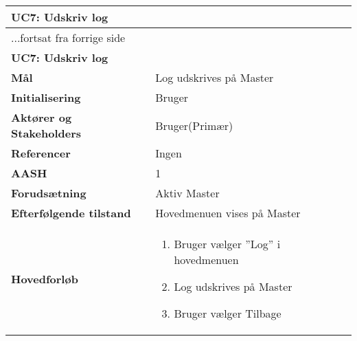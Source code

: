 \begin{center} \centering \label{UC7}
	\begin{longtable}{|p{5cm}|p{9cm}|}  %
	\hline
		\multicolumn{2}{|l|}{\textbf{UC7: Udskriv log}} \\\hline %
		\endfirsthead
		
		\multicolumn{2}{l}{...fortsat fra forrige side} \\ \hline %
		\multicolumn{2}{|l|}{\textbf{UC7: Udskriv log}} \\\hline %
		\endhead	
		
		\textbf{Mål}								&Log udskrives på Master	\\\hline
		\textbf{Initialisering}					&Bruger 					\\\hline
		\textbf{Aktører og Stakeholders}			&Bruger(Primær)			\\\hline
		\textbf{Referencer}						&Ingen					\\\hline
		\textbf{AASH}							&1						\\\hline
		\textbf{Forudsætning}					&Aktiv Master		\\\hline
		\textbf{Efterfølgende tilstand}			&Hovedmenuen vises på Master	\\\hline
		\textbf{Hovedforløb}					
			&\begin{enumerate}
	
				\item Bruger vælger ''Log'' i hovedmenuen 
				
				\item Log udskrives på Master
				
				\item Bruger vælger Tilbage
	
			\end{enumerate}\\\hline
	\end{longtable} 
\end{center}

